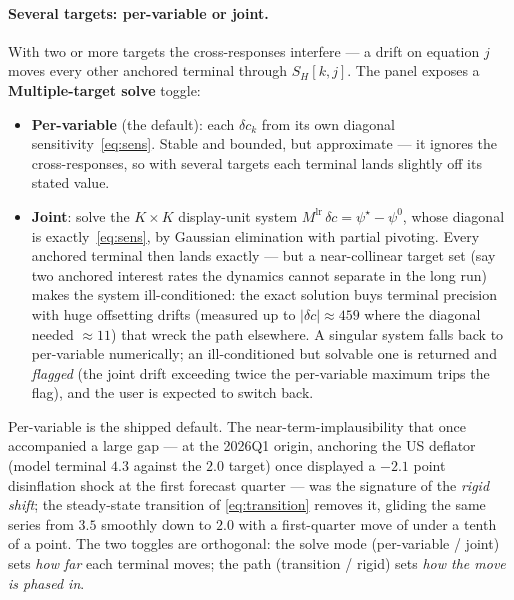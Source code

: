 \documentclass[11pt]{article}
\newcommand{\ui}[1]{\textbf{#1}}
\theoremstyle{plain}
\theoremstyle{remark}
\begin{document}
\paragraph{Several targets: per-variable or joint.} With two or more
targets the cross-responses interfere --- a drift on equation $j$ moves
every other anchored terminal through $S_H[k,j]$. The panel exposes a
\ui{Multiple-target solve} toggle:
\begin{itemize}
  \item \ui{Per-variable} (the default): each
    $\delta c_k$ from its own diagonal sensitivity~\eqref{eq:sens}.
    Stable and bounded, but approximate --- it ignores the
    cross-responses, so with several targets each terminal lands
    slightly off its stated value.
  \item \ui{Joint}: solve the $K \times K$ display-unit system
    $M^{\text{lr}}\,\delta c = \psi^\star - \psi^{0}$, whose diagonal is
    exactly~\eqref{eq:sens}, by Gaussian elimination with partial
    pivoting. Every anchored terminal then lands exactly --- but a
    near-collinear target set (say two anchored interest rates the
    dynamics cannot separate in the long run) makes the system
    ill-conditioned: the exact solution buys terminal precision with
    huge offsetting drifts (measured up to $|\delta c| \approx 459$
    where the diagonal needed $\approx 11$) that wreck the path
    elsewhere. A singular system falls back to per-variable
    numerically; an ill-conditioned but solvable one is returned and
    \emph{flagged} (the joint drift exceeding twice the per-variable
    maximum trips the flag), and the user is expected to switch back.
\end{itemize}
Per-variable is the shipped default. The near-term-implausibility that
once accompanied a large gap --- at the 2026Q1 origin, anchoring the US
deflator (model terminal $4.3$ against the $2.0$ target) once displayed a
$-2.1$ point disinflation shock at the first forecast quarter --- was the
signature of the \emph{rigid shift}; the steady-state transition of
\eqref{eq:transition} removes it, gliding the same series from $3.5$
smoothly down to $2.0$ with a first-quarter move of under a tenth of a
point. The two toggles are orthogonal: the solve mode (per-variable /
joint) sets \emph{how far} each terminal moves; the path (transition /
rigid) sets \emph{how the move is phased in}.
\end{document}
